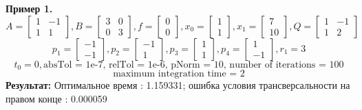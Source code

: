 \documentclass[10pt]{article}
\begin{document}
\textbf{Пример 1.}\smallskip\\
\[ A = \begin{bmatrix}
      		1 & -1 \\[0.3em]
      		1 & 1
      	  \end{bmatrix} , 
 B = \begin{bmatrix}
      	   3 & 0 \\[0.3em]
      	   0 & 3
      \end{bmatrix} ,
 f = \begin{bmatrix}
       	    0 \\[0.3em]
      	    0
      \end{bmatrix} ,
 x_0 = \begin{bmatrix}
      	    1 \\[0.3em]
      	    1
      \end{bmatrix} ,
 x_1 = \begin{bmatrix}
      	7 \\[0.3em]
      	10
      \end{bmatrix} ,
 Q = \begin{bmatrix}
      	   1 & -1 \\[0.3em]
      	   1 & 2
      \end{bmatrix} \]
\newpage
\[ p_1 = \begin{bmatrix}
      	-1 \\[0.3em]
      	-1
      \end{bmatrix} ,
p_2 = \begin{bmatrix}
      	-1 \\[0.3em]
      	1
      \end{bmatrix} ,
p_3 = \begin{bmatrix}
      	1 \\[0.3em]
      	1
      \end{bmatrix} ,
p_4 = \begin{bmatrix}
      	1 \\[0.3em]
      	-1
      \end{bmatrix}, r_1 = 3 \]
\[ t_0 = 0, \text{absTol = 1e-7, relTol = 1e-6, pNorm = 10, number of iterations = 100}\]  
\[\text{maximum integration time = 2} \]
\textbf{Результат:} Оптимальное время : 1.159331; ошибка условия трансверсальности на правом конце : 0.000059 
\end{document}
